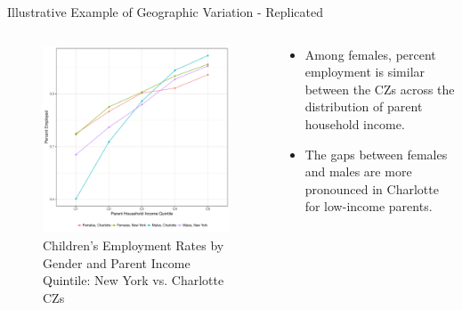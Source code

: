 \documentclass{beamer}
\begin{document}
\begin{frame}{Illustrative Example of Geographic Variation - Replicated}
\begin{columns}
	
	\begin{column}{0.52\textwidth}
		\vspace{\topsep}
		\begin{figure}
		\vspace{-0.5cm}	
		\includegraphics[width=\columnwidth]{../fig2.pdf}
		\caption{{\scriptsize Children’s Employment Rates by Gender and Parent Income Quintile:
			New York vs. Charlotte CZs}}
		\end{figure}	
\end{column}
	
	\begin{column}{0.4\textwidth}
				\vspace{-2.5cm}	
		\begin{itemize}
			\item Among females, percent employment is similar between the CZs across the distribution of parent household income.
			\item The gaps between females and males are more pronounced in Charlotte for low-income parents.
		\end{itemize}
	\end{column}
	
\end{columns}
\end{frame}
\end{document}
